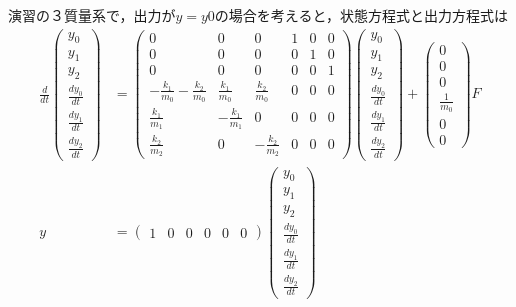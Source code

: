 \documentclass[a4paper,11pt]{jreport}
\begin{document}
演習の３質量系で，出力が$y=y0$の場合を考えると，状態方程式と出力方程式は
\begin{align}
 \frac{d}{dt} \left(\begin{array}{c}
	         y_0 \\
		     y_1 \\
		     y_2 \\
		     \frac{dy_0}{dt} \\
		     \frac{dy_1}{dt} \\
		     \frac{dy_2}{dt}
		    \end{array}\right)
 &=
 \left(\begin{array}{cccccc}
        0 & 0 & 0 & 1 & 0 & 0      \\
        0 & 0 & 0 & 0 & 1 & 0      \\
        0 & 0 & 0 & 0 & 0 & 1      \\
	-\frac{k_1}{m_0} -\frac{k_2}{m_0}&  \frac{k_1}{m_0} &  \frac{k_2}{m_0} & 0 & 0 & 0 \\
	 \frac{k_1}{m_1}                & -\frac{k_1}{m_1} &  0               & 0 & 0 & 0 \\
	 \frac{k_2}{m_2}                &  0               & -\frac{k_2}{m_2} & 0 & 0 & 0 
       \end{array}\right)
 \left(\begin{array}{c}
	         y_0 \\
		     y_1 \\
		     y_2 \\
		     \frac{dy_0}{dt} \\
		     \frac{dy_1}{dt} \\
		     \frac{dy_2}{dt}
       \end{array}\right)
 +
 \left(\begin{array}{c}
        0 \\
        0 \\
        0 \\
	    \frac{1}{m_0} \\
	    0 \\
	    0 
       \end{array}\right)
        F
\nonumber
\\
y &=
 \left(\begin{array}{cccccc}
         1 & 0 & 0 & 0 & 0 & 0
       \end{array}\right)
 \left(\begin{array}{c}
	         y_0 \\
		     y_1 \\
		     y_2 \\
		     \frac{dy_0}{dt} \\
		     \frac{dy_1}{dt} \\
		     \frac{dy_2}{dt}
       \end{array}\right)
\nonumber
\end{align}
\end{document}
